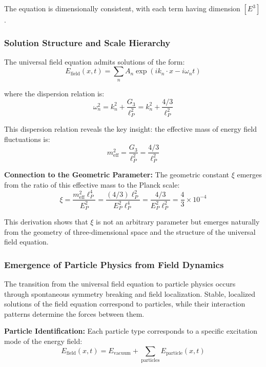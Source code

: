 \documentclass[12pt,a4paper]{article}
\begin{document}
	The equation is dimensionally consistent, with each term having dimension $[E^3]$.
	
	\subsubsection{Solution Structure and Scale Hierarchy}
	
	The universal field equation admits solutions of the form:
	\begin{equation}
		E_{\text{field}}(x,t) = \sum_n A_n \exp(ik_n \cdot x - i\omega_n t)
	\end{equation}
	
	where the dispersion relation is:
	\begin{equation}
		\omega_n^2 = k_n^2 + \frac{G_3}{\ell_P^2} = k_n^2 + \frac{4/3}{\ell_P^2}
	\end{equation}
	
	This dispersion relation reveals the key insight: the effective mass of energy field fluctuations is:
	\begin{equation}
		m_{\text{eff}}^2 = \frac{G_3}{\ell_P^2} = \frac{4/3}{\ell_P^2}
	\end{equation}
	
	\textbf{Connection to the Geometric Parameter:} The geometric constant $\xi$ emerges from the ratio of this effective mass to the Planck scale:
	\begin{equation}
		\xi = \frac{m_{\text{eff}}^2 \ell_P^4}{E_P^2} = \frac{(4/3) \ell_P^2}{E_P^2 \ell_P^4} = \frac{4/3}{E_P^2 \ell_P^2} = \frac{4}{3} \times 10^{-4}
	\end{equation}
	
	This derivation shows that $\xi$ is not an arbitrary parameter but emerges naturally from the geometry of three-dimensional space and the structure of the universal field equation.
	
	\subsubsection{Emergence of Particle Physics from Field Dynamics}
	
	The transition from the universal field equation to particle physics occurs through spontaneous symmetry breaking and field localization. Stable, localized solutions of the field equation correspond to particles, while their interaction patterns determine the forces between them.
	
	\textbf{Particle Identification:} Each particle type corresponds to a specific excitation mode of the energy field:
	\begin{equation}
		E_{\text{field}}(x,t) = E_{\text{vacuum}} + \sum_{\text{particles}} E_{\text{particle}}(x,t)
	\end{equation}
	
\end{document}
